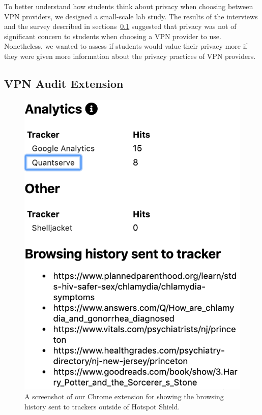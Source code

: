 To better understand how students think about privacy when choosing between VPN providers, we designed a small-scale lab study.
The results of the interviews and the survey described in sections~\ref{} suggested that privacy was not of significant concern to students when choosing a VPN provider to use.
Nonetheless, we wanted to assess if students would value their privacy more if they were given more information about the privacy practices of VPN providers.

\subsection{VPN Audit Extension}


\begin{figure}[t]
    \includegraphics[width=0.85\linewidth]{sections/figures/vpn-audit.png}
    \caption{A screenshot of our Chrome extension for showing the browsing history sent to trackers outside of Hotspot Shield.}
    \label{fig:vpn-audit}
\end{figure}

